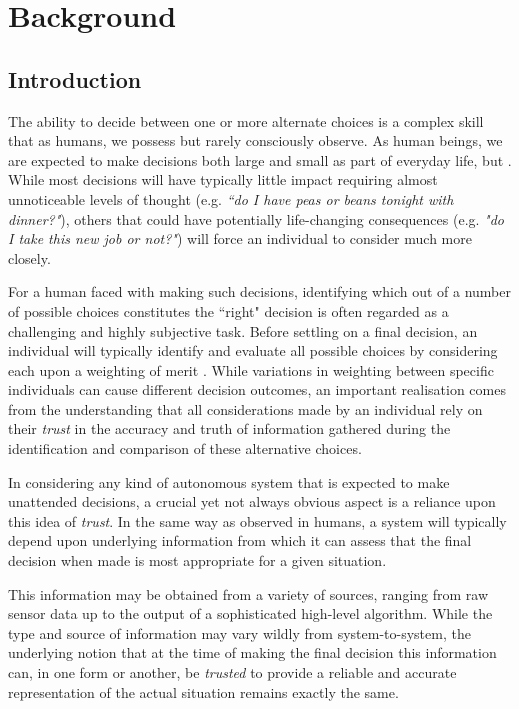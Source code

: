 \section{Background}

\subsection{Introduction}

The ability to decide between one or more alternate choices is a complex skill that as humans, we possess but rarely consciously observe. As human beings, we are expected to make decisions both large and small as part of everyday life, but . While most decisions will have typically little impact requiring almost unnoticeable levels of thought (e.g. \textit{``do I have peas or beans tonight with dinner?"}), others that could have potentially life-changing consequences (e.g. \textit{"do I take this new job or not?"}) will force an individual to consider much more closely.

For a human faced with making such decisions, identifying which out of a number of possible choices constitutes the ``right" decision is often regarded as a challenging and highly subjective task. %
Before settling on a final decision, an individual will typically identify and evaluate all possible choices by considering each upon a weighting of merit \cite{rational-decision-model}. While variations in weighting between specific individuals can cause different decision outcomes, an important realisation comes from the understanding that all considerations made by an individual rely on their \textit{trust} in the accuracy and truth of information gathered during the identification and comparison of these alternative choices.

 In considering any kind of autonomous system that is expected to make unattended decisions, a crucial yet not always obvious aspect is a reliance upon this idea of \textit{trust}. In the same way as observed in humans, a system will typically depend upon underlying information from which it can assess that the final decision when made is most appropriate for a given situation.
 
 This information may be obtained from a variety of sources, ranging from raw sensor data up to the output of a sophisticated high-level algorithm. While the type and source of information may vary wildly from system-to-system, the underlying notion that at the time of making the final decision this information can, in one form or another, be \textit{trusted} to provide a reliable and accurate representation of the actual situation remains exactly the same. 
 
